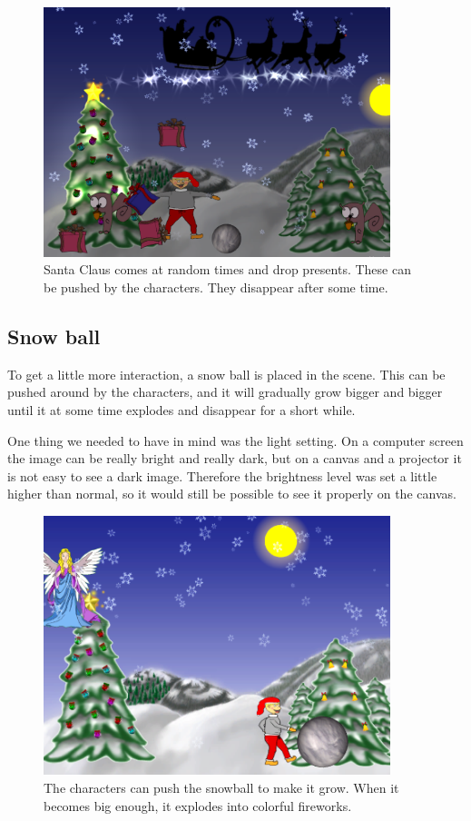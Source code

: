 \begin{figure}[htbp]
\centering
\includegraphics[width=0.90\textwidth]{Pictures/Design/santa.png}
\caption{Santa Claus comes at random times and drop presents. These can be pushed by the characters. They disappear after some time.}
\label{fig:santa}
\end{figure}

\subsection{Snow ball}
To get a little more interaction, a snow ball is placed in the scene. This can be pushed around by the characters, and it will gradually grow bigger and bigger until it at some time explodes and disappear for a short while.

One thing we needed to have in mind was the light setting. On a computer screen the image can be really bright and really dark, but on a canvas and a projector it is not easy to see a dark image. Therefore the brightness level was set a little higher than normal, so it would still be possible to see it properly on the canvas.

\begin{figure}[htbp]
\centering
\includegraphics[width=0.90\textwidth]{Pictures/Design/pushing_snowball.png}
\caption{The characters can push the snowball to make it grow. When it becomes big enough, it explodes into colorful fireworks.}
\label{fig:santa}
\end{figure}